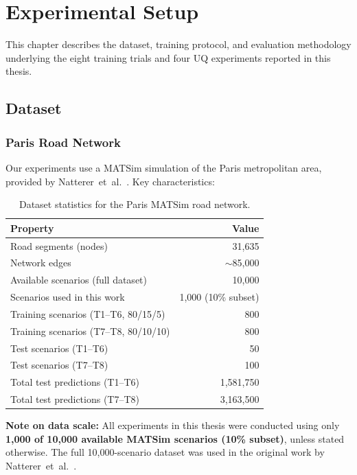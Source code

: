 
\chapter{Experimental Setup}\label{chapter:experiments}

This chapter describes the dataset, training protocol, and evaluation methodology underlying the eight training trials and four UQ experiments reported in this thesis.

\section{Dataset}

\subsection{Paris Road Network}

Our experiments use a MATSim simulation of the Paris metropolitan area, provided by Natterer~et~al.~\cite{natterer2025ml}. Key characteristics:

\begin{table}[htbp]
\centering
\caption[Paris road network dataset statistics]{Dataset statistics for the Paris MATSim road network.}
\label{tab:dataset}
\begin{tabular}{lr}
\toprule
\textbf{Property} & \textbf{Value} \\
\midrule
Road segments (nodes) & 31,635 \\
Network edges & $\sim$85,000 \\
Available scenarios (full dataset) & 10,000 \\
Scenarios used in this work & 1,000 (10\% subset) \\
Training scenarios (T1--T6, 80/15/5) & 800 \\
Training scenarios (T7--T8, 80/10/10) & 800 \\
Test scenarios (T1--T6) & 50 \\
Test scenarios (T7--T8) & 100 \\
Total test predictions (T1--T6) & 1,581,750 \\
Total test predictions (T7--T8) & 3,163,500 \\
\bottomrule
\end{tabular}
\end{table}

\textbf{Note on data scale:} All experiments in this thesis were conducted using only \textbf{1,000 of 10,000 available MATSim scenarios (10\% subset)}, unless stated otherwise. The full 10,000-scenario dataset was used in the original work by Natterer~et~al.~\cite{natterer2025ml}.

